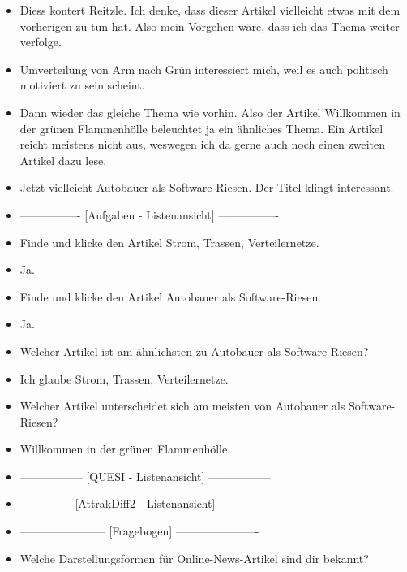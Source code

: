 {\begin{itemize}[]
              Ich würde mich jetzt gerne informieren welchen Zwang das bedeutet und wer dahinter steckt.
        \item {} \flqq Diess kontert Reitzle\frqq{}. Ich denke, dass dieser Artikel vielleicht etwas mit dem vorherigen zu tun hat.
              Also mein Vorgehen wäre, dass ich das Thema weiter verfolge.
        \item {} \flqq Umverteilung von Arm nach Grün\frqq{} interessiert mich, weil es auch politisch motiviert zu sein scheint.
        \item {} Dann wieder das gleiche Thema wie vorhin.
              Also der Artikel \flqq Willkommen in der grünen Flammenhölle\frqq{} beleuchtet ja ein ähnliches Thema.
              Ein Artikel reicht meistens nicht aus, weswegen ich da gerne auch noch einen zweiten Artikel dazu lese.
        \item {} Jetzt vielleicht \flqq Autobauer als Software-Riesen\frqq{}.
              Der Titel klingt interessant.
        \item {----------------} [Aufgaben - Listenansicht] {----------------}
        \item {} Finde und klicke den Artikel \flqq Strom, Trassen, Verteilernetze\frqq{}.
        \item {} Ja.
        \item {} Finde und klicke den Artikel \flqq Autobauer als Software-Riesen\frqq{}.
        \item {} Ja.
        \item {} Welcher Artikel ist am ähnlichsten zu \flqq Autobauer als Software-Riesen\frqq{}?
        \item {} Ich glaube \flqq Strom, Trassen, Verteilernetze\frqq{}.
        \item {} Welcher Artikel unterscheidet sich am meisten von \flqq Autobauer als Software-Riesen\frqq{}?
        \item {} \flqq Willkommen in der grünen Flammenhölle\frqq{}.
        \item {-----------------} [QUESI - Listenansicht] {-----------------}
        \item {--------------} [AttrakDiff2 - Listenansicht] {--------------}
        \item {-----------------------} [Fragebogen] {----------------------}
        \item {} Welche Darstellungsformen für Online-News-Artikel sind dir bekannt?

\end{itemize}}
